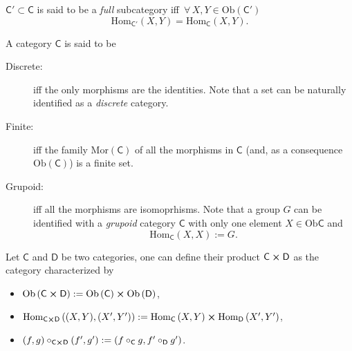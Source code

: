 \begin{defn}
	$\mathsf{C}' \subset \mathsf{C}$ is said to be a {\em full} subcategory iff $\,\forall\, X, Y \in \mathrm{Ob}(\mathsf{C}')$ 
	\begin{equation}
	\mathrm{Hom}_{\mathsf{C}'} \left( X, Y \right) = \mathrm{Hom}_{\mathsf{C}} \left( X, Y \right)
	.\end{equation} 
\end{defn}

\begin{defn}
	A category $\mathsf{C}$ is said to be
	\begin{description}
		\item[Discrete:] iff the only morphisms are the identities.
			Note that a set can be naturally identified as a {\em discrete} category.
		\item[Finite:] iff the family $\mathrm{Mor}(\mathsf{C})$ of all the morphisms in $\mathsf{C}$ (and, as a consequence $\mathrm{Ob}(\mathsf{C})$) is a finite set.
		\item[Grupoid:] iff all the morphisms are isomoprhisms.
			Note that a group $G$ can be identified with a {\em grupoid} category $\mathsf{C}$ with only one element $X \in \mathrm{Ob}\mathsf{C}$ and
			\begin{equation}
				\mathrm{Hom}_{\mathsf{C}} \left( X, X \right) := G
			.\end{equation} 
	\end{description} 
\end{defn}

\begin{defn}
	Let $\mathsf{C}$ and $\mathsf{D}$ be two categories, one can define their product $\mathsf{C}\cross \mathsf{D}$ as the category characterized by
	\begin{itemize}
		\item $\mathrm{Ob} \left(\mathsf{C}\cross \mathsf{D}\right) := \mathrm{Ob} \left(\mathsf{C}\right) \cross \mathrm{Ob} \left(\mathsf{D}\right)$,
		\item $\mathrm{Hom}_{\mathsf{C}\cross \mathsf{D}} \left( (X,Y), (X',Y') \right) := \mathrm{Hom}_{\mathsf{C}} \left( X, Y \right) \cross \mathrm{Hom}_{\mathsf{D}} \left( X', Y' \right)$,
		\item $\left(f, g\right)\circ_{\mathsf{C}\cross \mathsf{D}}\left(f', g'\right) := \left(f \circ_{\mathsf{C}}g, f' \circ_{\mathsf{D}} g' \right)$.
	\end{itemize} 
\end{defn}

